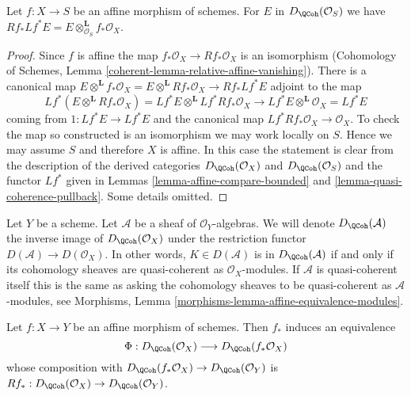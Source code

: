 \begin{lemma}
\label{lemma-affine-morphism-pull-push}
Let $f : X \to S$ be an affine morphism of schemes.
For $E$ in $D_\QCoh(\mathcal{O}_S)$ we have
$Rf_* Lf^* E = E \otimes^\mathbf{L}_{\mathcal{O}_S} f_*\mathcal{O}_X$.
\end{lemma}

\begin{proof}
Since $f$ is affine the map $f_*\mathcal{O}_X \to Rf_*\mathcal{O}_X$
is an isomorphism
(Cohomology of Schemes, Lemma \ref{coherent-lemma-relative-affine-vanishing}).
There is a canonical map $E \otimes^\mathbf{L} f_*\mathcal{O}_X =
E \otimes^\mathbf{L} Rf_*\mathcal{O}_X \to Rf_* Lf^* E$
adjoint to the map
$$
Lf^*(E \otimes^\mathbf{L} Rf_*\mathcal{O}_X) =
Lf^*E \otimes^\mathbf{L} Lf^*Rf_*\mathcal{O}_X \longrightarrow
Lf^* E \otimes^\mathbf{L} \mathcal{O}_X = Lf^* E
$$
coming from $1 : Lf^*E \to Lf^*E$ and the canonical map
$Lf^*Rf_*\mathcal{O}_X \to \mathcal{O}_X$. To check the map so constructed
is an isomorphism we may work locally on $S$. Hence we may assume
$S$ and therefore $X$ is affine. In this case the statement is clear from
the description of the derived categories
$D_\QCoh(\mathcal{O}_X)$ and
$D_\QCoh(\mathcal{O}_S)$ and the functor $Lf^*$ given in
Lemmas \ref{lemma-affine-compare-bounded} and
\ref{lemma-quasi-coherence-pullback}.
Some details omitted.
\end{proof}

\noindent
Let $Y$ be a scheme. Let $\mathcal{A}$ be a sheaf of $\mathcal{O}_Y$-algebras.
We will denote $D_\QCoh(\mathcal{A})$ the inverse image of
$D_\QCoh(\mathcal{O}_X)$ under the restriction functor
$D(\mathcal{A}) \to D(\mathcal{O}_X)$. In other words, $K \in D(\mathcal{A})$
is in $D_\QCoh(\mathcal{A})$ if and only if its cohomology sheaves are
quasi-coherent as $\mathcal{O}_X$-modules. If $\mathcal{A}$ is quasi-coherent
itself this is the same as asking the cohomology sheaves to be quasi-coherent
as $\mathcal{A}$-modules, see
Morphisms, Lemma \ref{morphisms-lemma-affine-equivalence-modules}.

\begin{lemma}
\label{lemma-affine-morphism-equivalence}
Let $f : X \to Y$ be an affine morphism of schemes. Then $f_*$ induces
an equivalence
$$
\Phi : D_\QCoh(\mathcal{O}_X) \longrightarrow D_\QCoh(f_*\mathcal{O}_X)
$$
whose composition with $D_\QCoh(f_*\mathcal{O}_X) \to D_\QCoh(\mathcal{O}_Y)$
is $Rf_* : D_\QCoh(\mathcal{O}_X) \to D_\QCoh(\mathcal{O}_Y)$.
\end{lemma}

